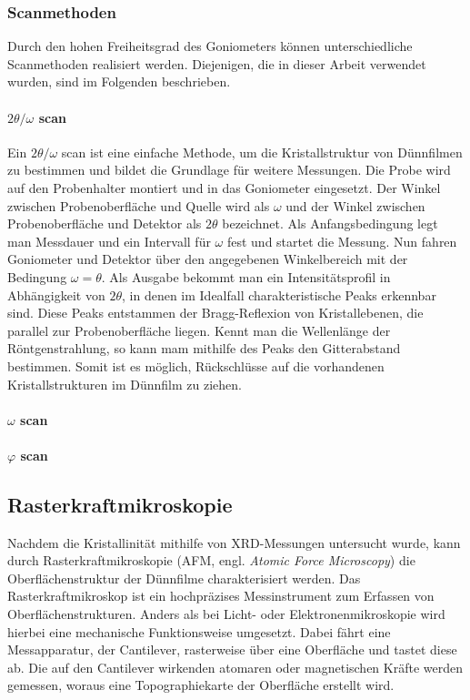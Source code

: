 \subsubsection{Scanmethoden}
Durch den hohen Freiheitsgrad des Goniometers können unterschiedliche Scanmethoden realisiert werden.
Diejenigen, die in dieser Arbeit verwendet wurden, sind im Folgenden beschrieben.

\paragraph{$2\theta/\omega$ scan}
Ein $2\theta/\omega$ scan ist eine einfache Methode, um die Kristallstruktur von Dünnfilmen zu bestimmen
und bildet die Grundlage für weitere Messungen.
Die Probe wird auf den Probenhalter montiert und in das Goniometer eingesetzt.
Der Winkel zwischen Probenoberfläche und Quelle wird als $\omega$ und der Winkel zwischen Probenoberfläche und Detektor
als $2\theta$ bezeichnet.
Als Anfangsbedingung legt man Messdauer und ein Intervall für $\omega$ fest und startet die Messung.
Nun fahren Goniometer und Detektor über den angegebenen Winkelbereich mit der Bedingung $\omega = \theta$.
Als Ausgabe bekommt man ein Intensitätsprofil in Abhängigkeit von $2\theta$, in denen im Idealfall charakteristische
Peaks erkennbar sind.
Diese Peaks entstammen der Bragg-Reflexion von Kristallebenen, die parallel zur Probenoberfläche liegen.
Kennt man die Wellenlänge der Röntgenstrahlung, so kann mam mithilfe des Peaks den Gitterabstand bestimmen.
Somit ist es möglich, Rückschlüsse auf die vorhandenen Kristallstrukturen im Dünnfilm zu ziehen.

\paragraph{$\omega$ scan}

\paragraph{$\varphi$ scan}
\newpage

\subsection{Rasterkraftmikroskopie}\label{subsec:afm}
Nachdem die Kristallinität mithilfe von XRD-Messungen untersucht wurde, kann durch Rasterkraftmikroskopie (AFM, engl.
\textit{Atomic Force Microscopy}) die Oberflächenstruktur der Dünnfilme charakterisiert werden.
Das Rasterkraftmikroskop ist ein hochpräzises Messinstrument zum Erfassen von Oberflächenstrukturen.
Anders als bei Licht- oder Elektronenmikroskopie wird hierbei eine mechanische Funktionsweise umgesetzt.
Dabei fährt eine Messapparatur, der Cantilever, rasterweise über eine Oberfläche und tastet diese ab.
Die auf den Cantilever wirkenden atomaren oder magnetischen Kräfte werden gemessen, woraus eine Topographiekarte der
Oberfläche erstellt wird.

